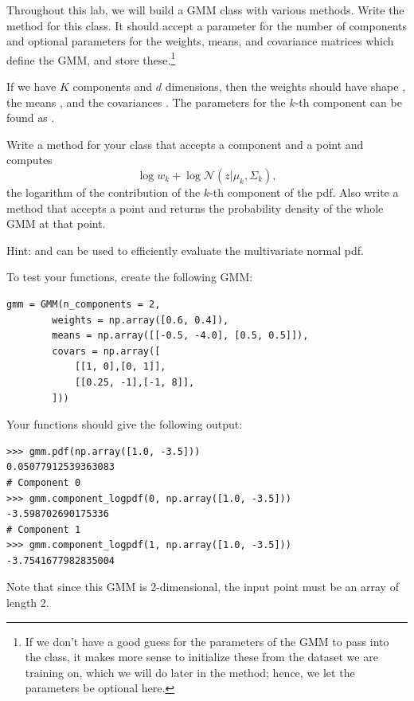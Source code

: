 \begin{problem}
Throughout this lab, we will build a GMM class with various methods.
Write the  method for this class.
It should accept a parameter for the number of components and optional parameters for the weights, means, and covariance matrices which define the GMM, and store these.\footnote{
If we don't have a good guess for the parameters of the GMM to pass into the class, it makes more sense to initialize these from the dataset we are training on, which we will do later in the  method; hence, we let the parameters be optional here.
}

If we have \(K\) components and \(d\) dimensions, then the weights should have shape , the means , and the covariances .
The parameters for the \(k\)-th component can be found as .
\end{problem}
\begin{problem}
Write a method  for your class that accepts a component  and a point  and computes 
\[
\log w_k + \log \mathcal{N}(z|\mu_k,\Sigma_k)
,
\]
the logarithm of the contribution of the \(k\)-th component of the pdf.
Also write a method  that accepts a point  and returns the probability density of the whole GMM at that point.

Hint:  and  can be used to efficiently evaluate the multivariate normal pdf.

To test your functions, create the following GMM:
\begin{lstlisting}
gmm = GMM(n_components = 2,
        weights = np.array([0.6, 0.4]),
        means = np.array([[-0.5, -4.0], [0.5, 0.5]]),
        covars = np.array([
            [[1, 0],[0, 1]],
            [[0.25, -1],[-1, 8]],
        ]))
\end{lstlisting}
Your functions should give the following output:
\begin{lstlisting}
>>> gmm.pdf(np.array([1.0, -3.5]))
0.05077912539363083
# Component 0
>>> gmm.component_logpdf(0, np.array([1.0, -3.5]))
-3.598702690175336
# Component 1
>>> gmm.component_logpdf(1, np.array([1.0, -3.5]))
-3.7541677982835004
\end{lstlisting}
Note that since this GMM is 2-dimensional, the input point must be an array of length 2.
\label{prob:gmm_has_example}
\end{problem}

